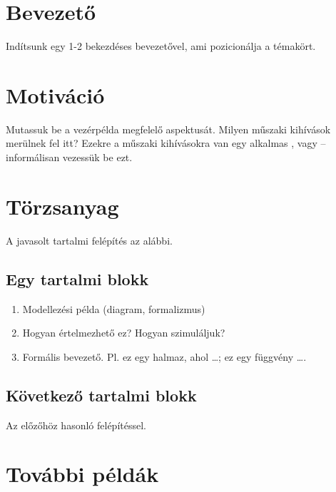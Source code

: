 
\section{Bevezető}

Indítsunk egy 1-2 bekezdéses bevezetővel, ami pozicionálja a témakört.

\section{Motiváció}

Mutassuk be a vezérpélda megfelelő aspektusát. Milyen műszaki kihívások merülnek fel itt? Ezekre a műszaki kihívásokra van egy alkalmas ,  vagy  -- informálisan vezessük be ezt.

\section{Törzsanyag}

A javasolt tartalmi felépítés az alábbi.

\subsection{Egy tartalmi blokk}

\begin{mdframed}
	\begin{enumerate}
	\item Modellezési példa (diagram, formalizmus)
	
	\item Hogyan értelmezhető ez? Hogyan szimuláljuk?
	
	\item Formális bevezető. Pl. ez egy halmaz, ahol \ldots; ez egy függvény \ldots.
	\end{enumerate}		
\end{mdframed}

\subsection{Következő tartalmi blokk}

Az előzőhöz hasonló felépítéssel.

\section{További példák}


